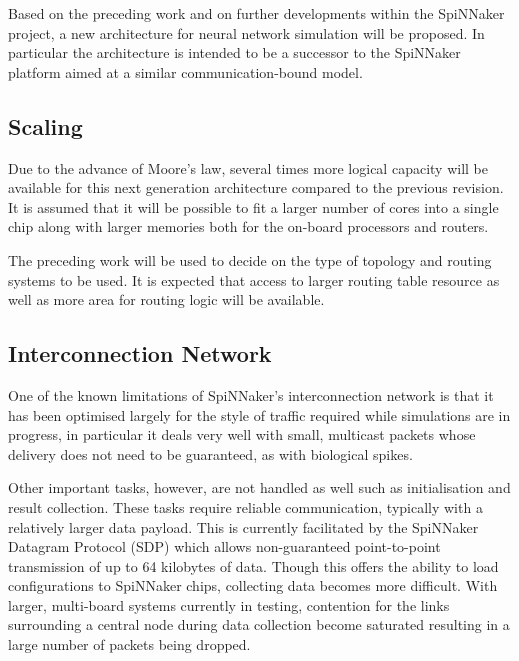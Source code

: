 		
		Based on the preceding work and on further developments within the
		SpiNNaker project, a new architecture for neural network simulation will be
		proposed. In particular the architecture is intended to be a successor to
		the SpiNNaker platform aimed at a similar communication-bound model.
		
		\subsection{Scaling}
			
			Due to the advance of Moore's law, several times more logical capacity
			will be available for this next generation architecture compared to the
			previous revision. It is assumed that it will be possible to fit a larger
			number of cores into a single chip along with larger memories both for the
			on-board processors and routers.
			
			The preceding work will be used to decide on the type of topology and
			routing systems to be used. It is expected that access to larger routing
			table resource as well as more area for routing logic will be available.
		
		\subsection{Interconnection Network}
			
			One of the known limitations of SpiNNaker's interconnection network is
			that it has been optimised largely for the style of traffic required while
			simulations are in progress, in particular it deals very well with small,
			multicast packets whose delivery does not need to be guaranteed, as with
			biological spikes.
			
			Other important tasks, however, are not handled as well such as
			initialisation and result collection. These tasks require reliable
			communication, typically with a relatively larger data payload. This is
			currently facilitated by the SpiNNaker Datagram Protocol (SDP)
			\cite{temple11} which allows non-guaranteed point-to-point transmission of
			up to 64 kilobytes of data. Though this offers the ability to load
			configurations to SpiNNaker chips, collecting data becomes more difficult.
			With larger, multi-board systems currently in testing, contention for the
			links surrounding a central node during data collection become saturated
			resulting in a large number of packets being dropped.
		
